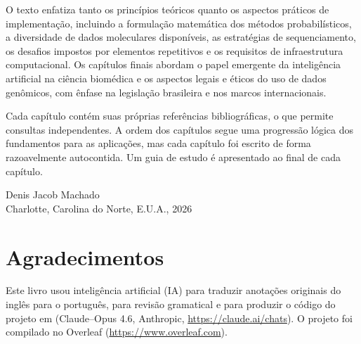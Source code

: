 \documentclass[11pt,a4paper,openright,twoside]{book}
\theoremstyle{definition}
\theoremstyle{plain}
\theoremstyle{remark}
\begin{document}
    O texto enfatiza tanto os princípios teóricos quanto os aspectos práticos de implementação, incluindo a formulação matemática dos métodos probabilísticos, a diversidade de dados moleculares disponíveis, as estratégias de sequenciamento, os desafios impostos por elementos repetitivos e os requisitos de infraestrutura computacional. Os capítulos finais abordam o papel emergente da inteligência artificial na ciência biomédica e os aspectos legais e éticos do uso de dados genômicos, com ênfase na legislação brasileira e nos marcos internacionais.

    Cada capítulo contém suas próprias referências bibliográficas, o que permite consultas independentes. A ordem dos capítulos segue uma progressão lógica dos fundamentos para as aplicações, mas cada capítulo foi escrito de forma razoavelmente autocontida. Um guia de estudo é apresentado ao final de cada capítulo.

\vspace{1cm}
\begin{flushright}
Denis Jacob Machado\\
Charlotte, Carolina do Norte, E.U.A., 2026
\end{flushright}

\mainmatter













\backmatter

\chapter{Agradecimentos}

    Este livro usou inteligência artificial (IA) para traduzir anotações originais do inglês para o português, para revisão gramatical e para produzir o código do projeto em  (Claude--Opus 4.6, Anthropic, \href{https://claude.ai/chats}{https://claude.ai/chats}). O projeto foi compilado no Overleaf (\href{https://www.overleaf.com}{https://www.overleaf.com}).
\end{document}
